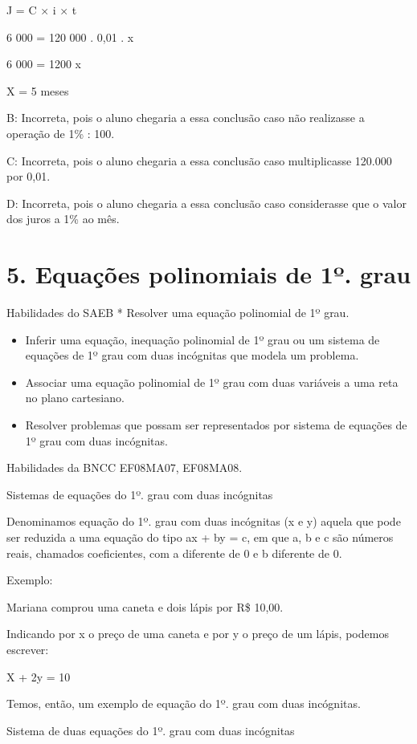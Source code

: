 J = C × i × t

6 000 = 120 000 . 0,01 . x

6 000 = 1200 x

X = 5 meses

B: Incorreta, pois o aluno chegaria a essa conclusão caso não realizasse
a operação de 1\% : 100.

C: Incorreta, pois o aluno chegaria a essa conclusão caso multiplicasse
120.000 por 0,01.

D: Incorreta, pois o aluno chegaria a essa conclusão caso considerasse
que o valor dos juros a 1\% ao mês.


\section{5. Equações polinomiais de 1º.
grau}

Habilidades do SAEB * Resolver uma equação polinomial de 1º grau.

\begin{itemize}
\item
  Inferir uma equação, inequação polinomial de 1º grau ou um sistema de
  equações de 1º grau com duas incógnitas que modela um problema.
\item
  Associar uma equação polinomial de 1º grau com duas variáveis a uma
  reta no plano cartesiano.
\item
  Resolver problemas que possam ser representados por sistema de
  equações de 1º grau com duas incógnitas.
\end{itemize}

Habilidades da BNCC EF08MA07, EF08MA08.

Sistemas de equações do 1º. grau com duas incógnitas

Denominamos equação do 1º. grau com duas incógnitas (x e y) aquela que
pode ser reduzida a uma equação do tipo ax + by = c, em que a, b e c são
números reais, chamados coeficientes, com a diferente de 0 e b diferente
de 0.

Exemplo:

Mariana comprou uma caneta e dois lápis por R\$ 10,00.

Indicando por x o preço de uma caneta e por y o preço de um lápis,
podemos escrever:

X + 2y = 10

Temos, então, um exemplo de equação do 1º. grau com duas incógnitas.

Sistema de duas equações do 1º. grau com duas incógnitas

